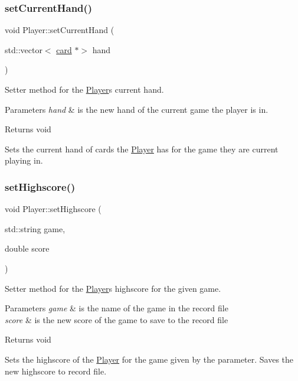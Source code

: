 \subsubsection{\texorpdfstring{set\+Current\+Hand()}{setCurrentHand()}}
{\footnotesize\ttfamily void Player\+::set\+Current\+Hand (\begin{DoxyParamCaption}\item[{std\+::vector$<$ \hyperlink{classcard}{card} $\ast$$>$}]{hand }\end{DoxyParamCaption})}



Setter method for the \hyperlink{classPlayer}{Player}\textquotesingle{}s current hand. 


\begin{DoxyParams}{Parameters}
{\em hand} & is the new hand of the current game the player is in. \\
\hline
\end{DoxyParams}
\begin{DoxyReturn}{Returns}
void
\end{DoxyReturn}
Sets the current hand of cards the \hyperlink{classPlayer}{Player} has for the game they are current playing in. \mbox{\label{classPlayer_ae77a5ec07cea02f94c7c8bc9830e2521}} 
\subsubsection{\texorpdfstring{set\+Highscore()}{setHighscore()}}
{\footnotesize\ttfamily void Player\+::set\+Highscore (\begin{DoxyParamCaption}\item[{std\+::string}]{game,  }\item[{double}]{score }\end{DoxyParamCaption})}



Setter method for the \hyperlink{classPlayer}{Player}\textquotesingle{}s highscore for the given game. 


\begin{DoxyParams}{Parameters}
{\em game} & is the name of the game in the record file \\
\hline
{\em score} & is the new score of the game to save to the record file \\
\hline
\end{DoxyParams}
\begin{DoxyReturn}{Returns}
void
\end{DoxyReturn}
Sets the highscore of the \hyperlink{classPlayer}{Player} for the game given by the parameter. Saves the new highscore to record file. \mbox{\label{classPlayer_afff83ec36cc74b248cf1a723ab0c2b6a}} 
